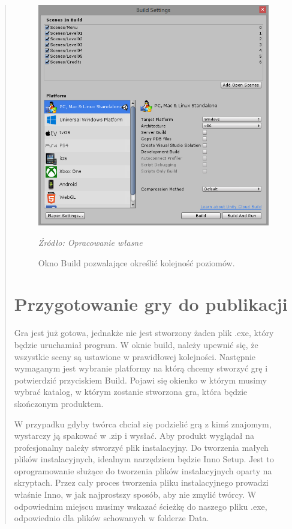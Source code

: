 \begin{quotation}
\begin{figure}[!h]
\centering
  \includegraphics[width=.8\linewidth]{build.png}
  \caption{Okno Build pozwalające określić kolejność poziomów.}\label{rys_29}
  \begin{minipage}[t]{0.75\linewidth}
    \emph{Źródło: Opracowanie własne}
  \end{minipage}
\end{figure}


\newpage
\section{Przygotowanie gry do publikacji}
\indent Gra jest już gotowa, jednakże nie jest stworzony żaden plik .exe, który będzie uruchamiał program. W oknie build, należy upewnić się, że wszystkie sceny są ustawione w prawidłowej kolejności. Następnie wymaganym jest wybranie platformy na którą chcemy stworzyć grę i potwierdzić przyciskiem Build. Pojawi się okienko w którym musimy wybrać katalog, w którym zostanie stworzona gra, która będzie skończonym produktem.

\indent W przypadku gdyby twórca chciał się podzielić grą z kimś znajomym, wystarczy ją spakować w .zip i wysłać. Aby produkt wyglądał na profesjonalny należy stworzyć plik instalacyjny. Do tworzenia małych plików instalacyjnych, idealnym narzędziem będzie Inno Setup. Jest to oprogramowanie służące do tworzenia plików instalacyjnych oparty na skryptach. Przez cały proces tworzenia pliku instalacyjnego prowadzi właśnie Inno, w jak najprostszy sposób, aby nie zmylić twórcy. W odpowiednim miejscu musimy wskazać ścieżkę do naszego pliku .exe, odpowiednio dla plików schowanych w folderze Data. 


\end{quotation}
